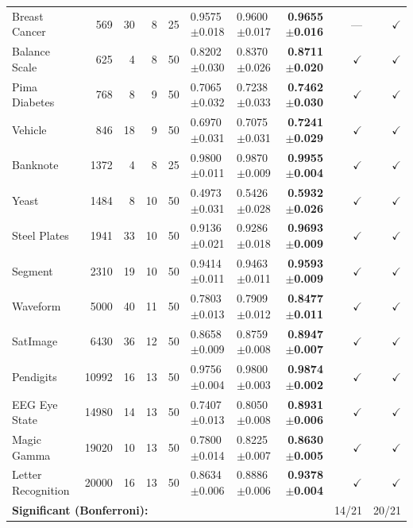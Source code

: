 \documentclass[runningheads]{llncs}
\begin{document}
\begin{table}[!tbp]
{\begin{tabular}{lrrrrllrrr}
    Breast Cancer      & 569   & 30 & 8  & 25 & 0.9575$\pm$0.018 & 0.9600$\pm$0.017 & \textbf{0.9655$\pm$0.016} & ---         & $\checkmark$ \\
    Balance Scale      & 625   & 4  & 8  & 50 & 0.8202$\pm$0.030 & 0.8370$\pm$0.026 & \textbf{0.8711$\pm$0.020} & $\checkmark$ & $\checkmark$ \\
    Pima Diabetes      & 768   & 8  & 9  & 50 & 0.7065$\pm$0.032 & 0.7238$\pm$0.033 & \textbf{0.7462$\pm$0.030} & $\checkmark$ & $\checkmark$ \\
    Vehicle            & 846   & 18 & 9  & 50 & 0.6970$\pm$0.031 & 0.7075$\pm$0.031 & \textbf{0.7241$\pm$0.029} & $\checkmark$ & $\checkmark$ \\
    Banknote           & 1372  & 4  & 8  & 25 & 0.9800$\pm$0.011 & 0.9870$\pm$0.009 & \textbf{0.9955$\pm$0.004} & $\checkmark$ & $\checkmark$ \\
    Yeast              & 1484  & 8  & 10 & 50 & 0.4973$\pm$0.031 & 0.5426$\pm$0.028 & \textbf{0.5932$\pm$0.026} & $\checkmark$ & $\checkmark$ \\
    Steel Plates       & 1941  & 33 & 10 & 50 & 0.9136$\pm$0.021 & 0.9286$\pm$0.018 & \textbf{0.9693$\pm$0.009} & $\checkmark$ & $\checkmark$ \\
    Segment            & 2310  & 19 & 10 & 50 & 0.9414$\pm$0.011 & 0.9463$\pm$0.011 & \textbf{0.9593$\pm$0.009} & $\checkmark$ & $\checkmark$ \\
    Waveform           & 5000  & 40 & 11 & 50 & 0.7803$\pm$0.013 & 0.7909$\pm$0.012 & \textbf{0.8477$\pm$0.011} & $\checkmark$ & $\checkmark$ \\
    SatImage           & 6430  & 36 & 12 & 50 & 0.8658$\pm$0.009 & 0.8759$\pm$0.008 & \textbf{0.8947$\pm$0.007} & $\checkmark$ & $\checkmark$ \\
    Pendigits          & 10992 & 16 & 13 & 50 & 0.9756$\pm$0.004 & 0.9800$\pm$0.003 & \textbf{0.9874$\pm$0.002} & $\checkmark$ & $\checkmark$ \\
    EEG Eye State      & 14980 & 14 & 13 & 50 & 0.7407$\pm$0.013 & 0.8050$\pm$0.008 & \textbf{0.8931$\pm$0.006} & $\checkmark$ & $\checkmark$ \\
    Magic Gamma        & 19020 & 10 & 13 & 50 & 0.7800$\pm$0.014 & 0.8225$\pm$0.007 & \textbf{0.8630$\pm$0.005} & $\checkmark$ & $\checkmark$ \\
    Letter Recognition & 20000 & 16 & 13 & 50 & 0.8634$\pm$0.006 & 0.8886$\pm$0.006 & \textbf{0.9378$\pm$0.004} & $\checkmark$ & $\checkmark$ \\
    \midrule
    \multicolumn{5}{l}{\textbf{Significant (Bonferroni):}} & & & & 14/21 & 20/21 \\
    \bottomrule
  \end{tabular}%
  }
\end{table}
\end{document}
